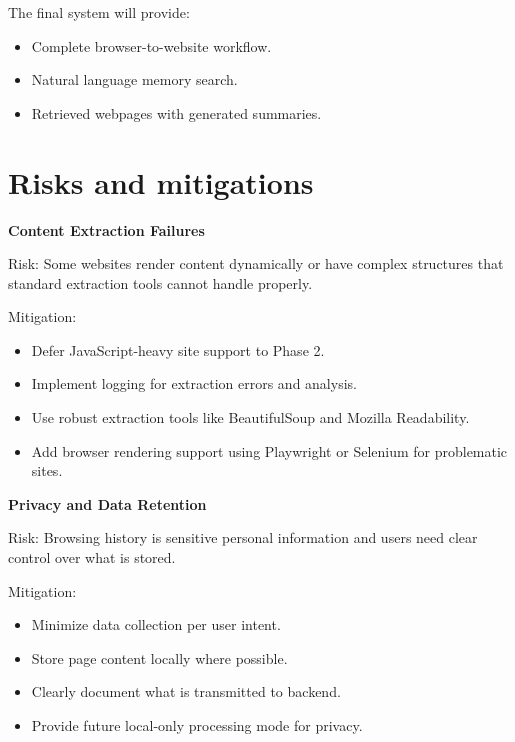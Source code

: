 \documentclass[11pt,a4paper]{article}
\begin{document}
The final system will provide:

\begin{itemize}[leftmargin=0.7cm]

\item Complete browser-to-website workflow.

\item Natural language memory search.

\item Retrieved webpages with generated summaries.

\end{itemize}


\section{Risks and mitigations}

\textbf{Content Extraction Failures}

Risk: Some websites render content dynamically or have complex structures that standard extraction tools cannot handle properly.

Mitigation:

\begin{itemize}[leftmargin=0.7cm]

\item Defer JavaScript-heavy site support to Phase 2.

\item Implement logging for extraction errors and analysis.

\item Use robust extraction tools like BeautifulSoup and Mozilla Readability.

\item Add browser rendering support using Playwright or Selenium for problematic sites.

\end{itemize}


\textbf{Privacy and Data Retention}

Risk: Browsing history is sensitive personal information and users need clear control over what is stored.

Mitigation:

\begin{itemize}[leftmargin=0.7cm]

\item Minimize data collection per user intent.

\item Store page content locally where possible.

\item Clearly document what is transmitted to backend.

\item Provide future local-only processing mode for privacy.

\end{itemize}
\end{document}

